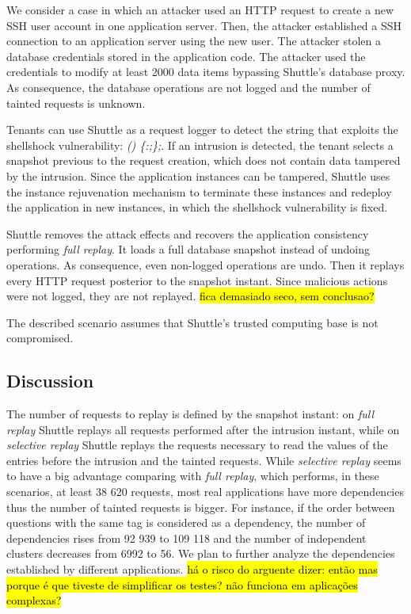 We consider a case in which an attacker used an \ac{HTTP} request to create a new \ac{SSH} user account in one application server. Then, the attacker established a \ac{SSH} connection to an application server using the new user. The attacker stolen a database credentials stored in the application code. The attacker used the credentials to modify at least 2000 data items bypassing Shuttle's database proxy. As consequence, the database operations are not logged and the number of tainted requests is unknown.

Tenants can use Shuttle as a request logger to detect the string that exploits the shellshock vulnerability: \emph{() \{:;\};}. If an intrusion is detected, the tenant selects a snapshot previous to the request creation, which does not contain data tampered by the intrusion. Since the application instances can be tampered, Shuttle uses the instance rejuvenation mechanism to terminate these instances and redeploy the application in new instances, in which the shellshock vulnerability is fixed.

Shuttle removes the attack effects and recovers the application consistency performing \emph{full replay}. It loads a full database snapshot instead of undoing operations. As consequence, even non-logged operations are undo. Then it replays every HTTP request posterior to the snapshot instant. Since malicious actions were not logged, they are not replayed. \hl{fica demasiado seco, sem conclusao?}

The described scenario assumes that Shuttle's trusted computing base is not compromised.

\subsection{Discussion}\label{sec:eval:accuracy:discussion}
The number of requests to replay is defined by the snapshot instant: on \textit{full replay} Shuttle replays all requests performed after the intrusion instant, while on \textit{selective replay} Shuttle replays the requests necessary to read the values of the entries before the intrusion and the tainted requests. While \textit{selective replay} seems to have a big advantage comparing with  \textit{full replay}, which performs, in these scenarios, at least 38 620 requests, most real applications have more dependencies thus the number of tainted requests is bigger. For instance, if the order between questions with the same tag is considered as a dependency,  the number of dependencies rises from 92 939 to 109 118 and the number of independent clusters decreases from 6992 to 56. We plan to further analyze the dependencies established by different applications. \hl{há o risco do arguente dizer: então mas porque é que tiveste de simplificar os testes? não funciona em aplicações complexas?}



